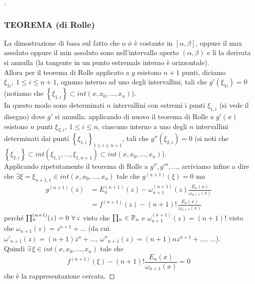 \begin{proof}[\unskip\nopunct]
\subsubsection{TEOREMA (di Rolle)}
\begin{center}
\end{center}
La dimostrazione di basa sul fatto che o $\phi$ è costante in $[\alpha,\beta]$, oppure il max assoluto oppure il min assoluto sono nell'intervallo aperto $(\alpha,\beta)$ e lì la derivata si annulla (la tangente in un punto estremale interno è orizzontale). \\
Allora per il teorema di Rolle applicato a $g$ esistono $n+1$ punti, diciamo $\xi_{1i}, \ 1 \leq i \leq n+1$, ognuno interno ad uno degli intervallini, tali che $g'(\xi_{1i})=0$ (notiamo che $\left\{ \xi_{1,i} \right\} \subset int(x,x_0,\dots,x_n)$). \\
In questo modo sono determinati $n$ intervallini con estremi i punti $\xi_{1,i}$ (si vede il disegno) dove $g'$ si annulla: applicando di nuovo il teorema di Rolle a $g'(x)$ esistono $n$ punti $\xi_{2,i}, \ 1 \leq i \leq n$, ciascuno interno a uno degli $n$ intervallini determinati dai punti $\left\{ \xi_{1,i} \right\}_{1 \leq i \leq n+1}$, tali che $g''(\xi_{2,i}) = 0$ (si noti che $\left\{ \xi_{2,i} \right\} \subset int(\xi_{1,1},\dots, \xi_{1,n+1}) \subset int(x,x_0,\dots,x_n)$). \\
Applicando ripetutamente il teorema di Rolle a $g'',g''',\dotso$, arriviamo infine a dire che $\exists \xi = \xi_{n+1,1} \in int(x,x_0,\dots,x_n)$ tale che $g^{(n+1)}(\xi) = 0$ ma
\[\begin{split}
    g^{(n+1)}(z) & = E_n^{(n+1)}(z) - \omega_{n+1}^{(n+1)}(z) \frac{E_n(x)}{\omega_{n+1}(x)} \\
    & = f^{(n+1)}(z) - (n+1)!\, \frac{E_n(x)}{\omega_{n+1}(x)}
\end{split}\]
perché $\begin{matrix}\prod\end{matrix}_n^{(n+1)}(z) = 0 \,\,\forall\,z$ visto che $\begin{matrix}\prod\end{matrix}_n \in \mathbb{P}_n$ e $\omega_{n+1}^{(n+1)}(z) = (n+1)!$ visto che $\omega_{n+1}(z) = z^{n+1} + \dotso$ (da cui $\omega'_{n+1}(z) = (n+1)z^n + \dotso,\, \omega''_{n+1}(z) = (n+1)nz^{n+1} + \dotso,\,\dotso$).\\
Quindi $\exists \, \xi \in int(x,x_0,\dotso,x_n)$ tale che
\[f^{(n+1)}(\xi) - (n+1)!\frac{E_n(x)}{\omega_{n+1}(x)} = 0\]
che è la rappresentazione cercata.
\end{proof}

